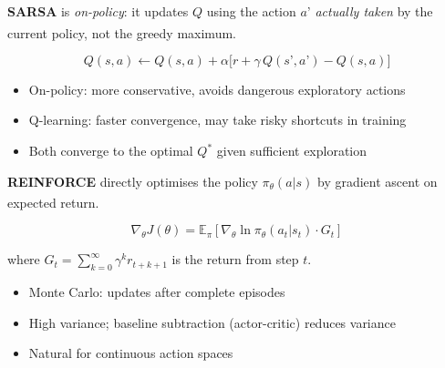 \begin{tcbitemize}[ skin=sectionraster ]
    \tcbitem[title={SARSA: On-Policy TD Control}, raster multicolumn=3]
    \textbf{SARSA} is \emph{on-policy}: it updates $Q$ using the action $a’$
    \emph{actually taken} by the current policy, not the greedy
    maximum.\textsuperscript{\cite[][Ch.~6]{suttonReinforcementLearningIntroduction2018}}

    \begin{equation}
        Q(s,a) \leftarrow Q(s,a) + \alpha\bigl[r + \gamma\,Q(s’,a’) - Q(s,a)\bigr]
    \end{equation}

    \begin{itemize}
        \item On-policy: more conservative, avoids dangerous exploratory actions
        \item Q-learning: faster convergence, may take risky shortcuts in training
        \item Both converge to the optimal $Q^*$ given sufficient exploration
    \end{itemize}

    \tcbitem[title=REINFORCE (Policy Gradient), raster multicolumn=3]
    \textbf{REINFORCE} directly optimises the policy $\pi_\theta(a|s)$ by
    gradient ascent on expected
    return.\textsuperscript{\cite[][Ch.~13]{suttonReinforcementLearningIntroduction2018}}

    \begin{equation}
        \nabla_\theta J(\theta) = \mathbb{E}_\pi\!\left[
            \nabla_\theta \ln \pi_\theta(a_t|s_t) \cdot G_t\right]
    \end{equation}

    where $G_t = \sum_{k=0}^{\infty} \gamma^k r_{t+k+1}$ is the return from step $t$.

    \begin{itemize}
        \item Monte Carlo: updates after complete episodes
        \item High variance; baseline subtraction (actor-critic) reduces variance
        \item Natural for continuous action spaces
    \end{itemize}

    \end{tcbitemize}

